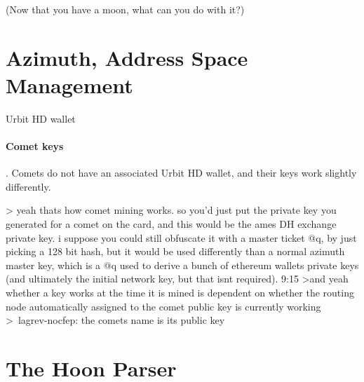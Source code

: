 (Now that you have a moon, what can you do with it?)


\section[Azimuth]{Azimuth, Address Space Management}

Urbit HD wallet


\paragraph{Comet keys}.  Comets do not have an associated Urbit HD wallet, and their keys work slightly differently.

> yeah thats how comet mining works. so you'd just put the private key you generated for a comet on the card, and this would be the ames DH exchange private key. i suppose you could still obfuscate it with a master ticket @q, by just picking a 128 bit hash, but it would be used differently than a normal azimuth master key, which is a @q used to derive a bunch of ethereum wallets private keys (and ultimately the initial network key, but that isnt required).
9:15
>and yeah whether a key works at the time it is mined is dependent on whether the routing node automatically assigned to the comet public key is currently working
>~lagrev-nocfep: the comets name is its public key


\section[Hoon Parser]{The Hoon Parser}
